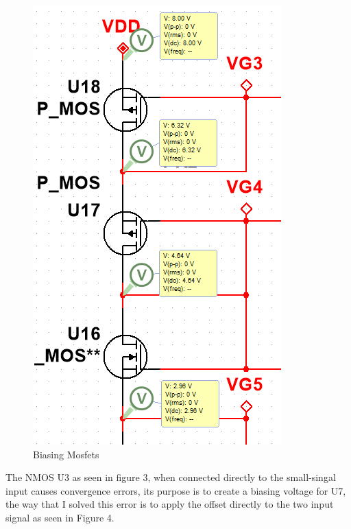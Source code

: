 \documentclass[12pt]{article}
\begin{document}
	
	\begin{figure}[h!]
		\label{fig:amp}
		\caption{Biasing Mosfets}
		\centering
		\includegraphics[width=.4\textwidth]{biasingdrop}
	\end{figure}
	

	\newpage
	The NMOS U3 as seen in figure 3, when connected directly to the small-singal input causes convergence errors, its purpose is to create a biasing voltage for U7, the way that I solved this error is to apply the offset directly to the two input signal as seen in Figure 4. 
	
\end{document}
